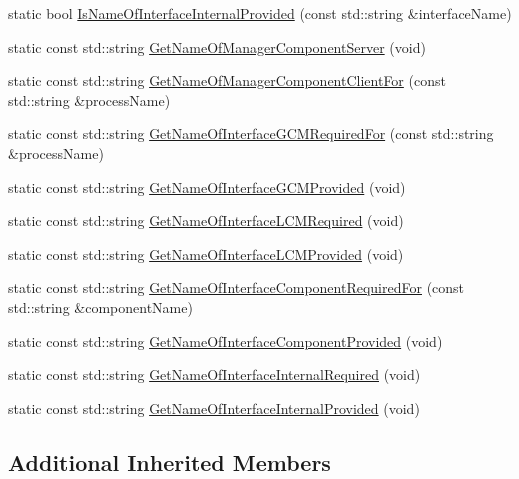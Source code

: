 \begin{DoxyCompactItemize}
\item 
static bool \hyperlink{classmts_manager_component_base_aad29ed7630db6bc4a37efe480945eda1}{Is\-Name\-Of\-Interface\-Internal\-Provided} (const std\-::string \&interface\-Name)
\item 
static const std\-::string \hyperlink{classmts_manager_component_base_ab6a169dbc07a54ad39a88323927d7284}{Get\-Name\-Of\-Manager\-Component\-Server} (void)
\item 
static const std\-::string \hyperlink{classmts_manager_component_base_a2bdf936f48e5b8ba961c1841dc74ab0f}{Get\-Name\-Of\-Manager\-Component\-Client\-For} (const std\-::string \&process\-Name)
\item 
static const std\-::string \hyperlink{classmts_manager_component_base_a19f5e7676b8db2b0a8e7624f26bbc56d}{Get\-Name\-Of\-Interface\-G\-C\-M\-Required\-For} (const std\-::string \&process\-Name)
\item 
static const std\-::string \hyperlink{classmts_manager_component_base_a0e87161298f11e2e26132f382d4b8773}{Get\-Name\-Of\-Interface\-G\-C\-M\-Provided} (void)
\item 
static const std\-::string \hyperlink{classmts_manager_component_base_a2d1b7cd5ead97d34b407aaf6cd4e1090}{Get\-Name\-Of\-Interface\-L\-C\-M\-Required} (void)
\item 
static const std\-::string \hyperlink{classmts_manager_component_base_aa1e667346d1846bc5213772ff3dedf11}{Get\-Name\-Of\-Interface\-L\-C\-M\-Provided} (void)
\item 
static const std\-::string \hyperlink{classmts_manager_component_base_a7daa8255953c4e386dc152b7caa1160c}{Get\-Name\-Of\-Interface\-Component\-Required\-For} (const std\-::string \&component\-Name)
\item 
static const std\-::string \hyperlink{classmts_manager_component_base_aabbab31ba72a7f8a8c3b4bb823fabb3d}{Get\-Name\-Of\-Interface\-Component\-Provided} (void)
\item 
static const std\-::string \hyperlink{classmts_manager_component_base_a4f0da48295f4835382d2505e5433eff9}{Get\-Name\-Of\-Interface\-Internal\-Required} (void)
\item 
static const std\-::string \hyperlink{classmts_manager_component_base_a6d1c901c5cdf7902edee5ec5cd477f69}{Get\-Name\-Of\-Interface\-Internal\-Provided} (void)
\end{DoxyCompactItemize}
\subsection*{Additional Inherited Members}


